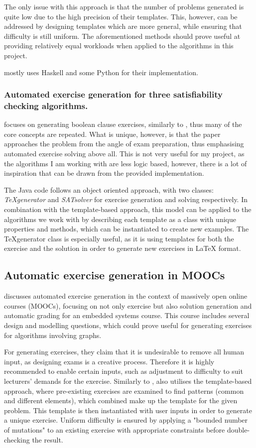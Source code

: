 \documentclass{l4proj}
\begin{document}
The only issue with this approach is that the number of problems generated is quite low due to the high precision of their templates. This, however, can be addressed by designing templates which are more general, while ensuring that difficulty is still uniform. The aforementioned methods should prove useful at providing relatively equal workloads when applied to the algorithms in this project. 

\citet{Hoz21} mostly uses Haskell and some Python for their implementation.

\subsubsection{Automated exercise generation for three satisfiability checking algorithms.}

\citet{Esh22} focuses on generating boolean clause exercises, similarly to \citet{Hoz21}, thus many of the core concepts are repeated. What is unique, however, is that the paper approaches the problem from the angle of exam preparation, thus emphasising automated exercise solving above all. This is not very useful for my project, as the algorithms I am working with are less logic based, however, there is a lot of inspiration that can be drawn from the provided implementation. 

The Java code follows an object oriented approach, with two classes: \emph{TeXgenerator} and \emph{SATsolver} for exercise generation and solving respectively. In combination with the template-based approach, this model can be applied to the algorithms we work with by describing each template as a class with unique properties and methods, which can be instantiated to create new examples. The TeXgenerator class is especially useful, as it is using templates for both the exercise and the solution in order to generate new exercises in LaTeX format. 

\subsection{Automatic exercise generation in MOOCs}
\citet{Sad12} discusses automated exercise generation in the context of massively open online courses (MOOCs), focusing on not only exercise but also solution generation and automatic grading for an embedded systems course. This course includes several design and modelling questions, which could prove useful for generating exercises for algorithms involving graphs. 

For generating exercises, they claim that it is undesirable to remove all human input, as designing exams is a creative process. Therefore it is highly recommended to enable certain inputs, such as adjustment to difficulty to suit lecturers' demands for the exercise. Similarly to \citet{Hoz21}, \citet{Sad12} also utilises the template-based approach, where pre-existing exercises are examined to find patterns (common and different elements), which combined make up the template for the given problem. This template is then instantiated with user inputs in order to generate a unique exercise. Uniform difficulty is ensured by applying a "bounded number of mutations" to an existing exercise with appropriate constraints before double-checking the result. 
\end{document}
